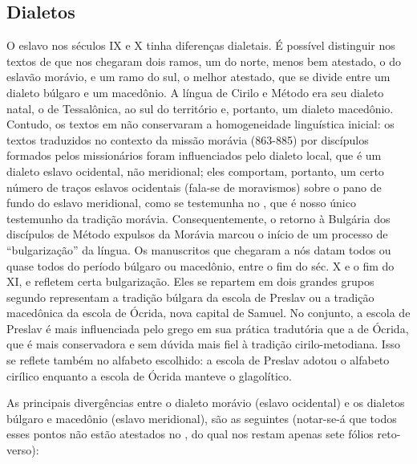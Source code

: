 \subsection{Dialetos}
O eslavo nos séculos IX e X tinha diferenças dialetais. É possível distinguir
nos textos de  que nos chegaram dois ramos, um do norte, menos bem
atestado, o do eslavão morávio, e um ramo do sul, o melhor atestado, que se
divide entre um dialeto búlgaro e um macedônio. A língua de Cirilo e Método
era seu dialeto natal, o de Tessalônica, ao sul do território e, portanto, um
dialeto macedônio. Contudo, os textos em  não conservaram a homogeneidade
linguística inicial: os textos traduzidos no contexto da missão morávia
(863-885) por discípulos formados pelos missionários foram influenciados pelo
dialeto local, que é um dialeto eslavo ocidental, não meridional; eles
comportam, portanto, um certo número de traços eslavos ocidentais (fala-se de
moravismos) sobre o pano de fundo do eslavo meridional, como se testemunha no
, que é nosso único testemunho da tradição morávia.
Consequentemente, o retorno à Bulgária dos discípulos de Método expulsos da
Morávia marcou o início de um processo de ``bulgarização'' da língua. Os
manuscritos que chegaram a nós datam todos ou quase todos do período búlgaro
ou macedônio, entre o fim do séc. X e o fim do XI, e refletem certa
bulgarização. Eles se repartem em dois grandes grupos segundo representam a
tradição búlgara da escola de Preslav ou a tradição macedônica da escola de
Ócrida, nova capital de Samuel. No conjunto, a escola de Preslav é mais
influenciada pelo grego em sua prática tradutória que a de Ócrida, que é mais
conservadora e sem dúvida mais fiel à tradição cirilo\hyp{}metodiana. Isso se
reflete também no alfabeto escolhido: a escola de Preslav adotou o alfabeto
cirílico enquanto a escola de Ócrida manteve o glagolítico.

As principais divergências entre o dialeto morávio (eslavo ocidental) e os
dialetos búlgaro e macedônio (eslavo meridional), são as seguintes
(notar-se-á que todos esses pontos não estão atestados no , do
qual nos restam apenas sete fólios reto-verso):


